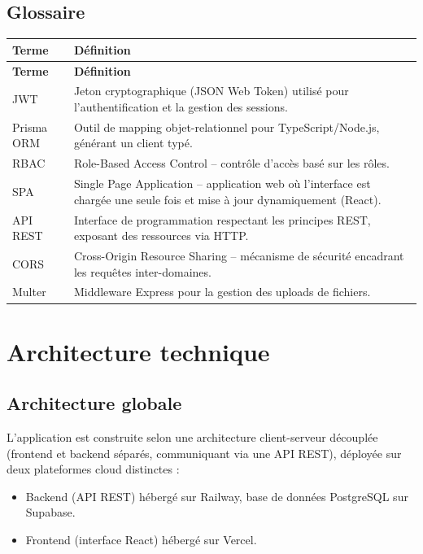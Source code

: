 \documentclass[12pt,a4paper]{report}
\begin{document}
\section{Glossaire}
\begin{longtable}{|p{2.5cm}|p{12cm}|}
\hline
\textbf{Terme} & \textbf{Définition} \\
\hline
\endfirsthead
\hline
\textbf{Terme} & \textbf{Définition} \\
\hline
\endhead
JWT & Jeton cryptographique (JSON Web Token) utilisé pour l'authentification et la gestion des sessions. \\
\hline
Prisma ORM & Outil de mapping objet-relationnel pour TypeScript/Node.js, générant un client typé. \\
\hline
RBAC & Role-Based Access Control -- contrôle d'accès basé sur les rôles. \\
\hline
SPA & Single Page Application -- application web où l'interface est chargée une seule fois et mise à jour dynamiquement (React). \\
\hline
API REST & Interface de programmation respectant les principes REST, exposant des ressources via HTTP. \\
\hline
CORS & Cross-Origin Resource Sharing -- mécanisme de sécurité encadrant les requêtes inter-domaines. \\
\hline
Multer & Middleware Express pour la gestion des uploads de fichiers. \\
\hline
\end{longtable}
 
\chapter{Architecture technique}
 
\section{Architecture globale}
L'application est construite selon une architecture client-serveur découplée (frontend et backend séparés, communiquant via une API REST), déployée sur deux plateformes cloud distinctes :
\begin{itemize}[leftmargin=*]
    \item Backend (API REST) hébergé sur Railway, base de données PostgreSQL sur Supabase.
    \item Frontend (interface React) hébergé sur Vercel.
\end{itemize}
\end{document}
